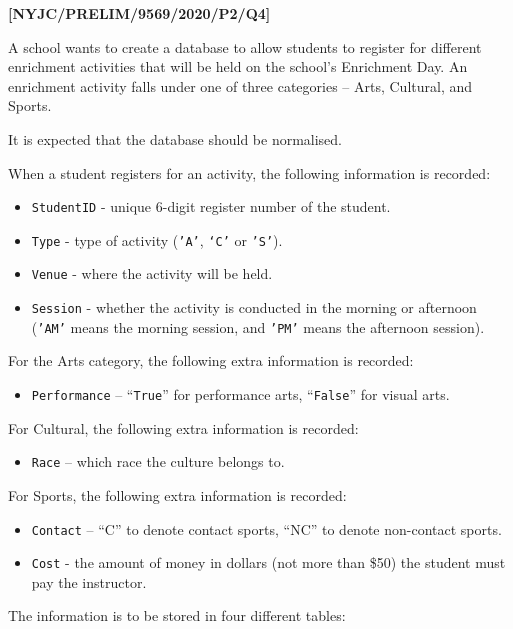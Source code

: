 \item \textbf{{[}NYJC/PRELIM/9569/2020/P2/Q4{]} }

A school wants to create a database to allow students to register
for different enrichment activities that will be held on the school\textquoteright s
Enrichment Day. An enrichment activity falls under one of three categories
-- Arts, Cultural, and Sports. 

It is expected that the database should be normalised. 

When a student registers for an activity, the following information
is recorded: 
\begin{itemize}
\item \texttt{StudentID} - unique 6-digit register number of the student. 
\item \texttt{Type} - type of activity (\texttt{'A\textquoteright }, \texttt{\textquoteleft C\textquoteright{}}
or \texttt{'S'}). 
\item \texttt{Venue} - where the activity will be held. 
\item \texttt{Session} - whether the activity is conducted in the morning
or afternoon (\texttt{'AM'} means the morning session, and \texttt{'PM'}
means the afternoon session). 
\end{itemize}
For the Arts category, the following extra information is recorded: 
\begin{itemize}
\item \texttt{Performance} -- \textquotedblleft \texttt{True}\textquotedblright{}
for performance arts, \textquotedblleft \texttt{False}\textquotedblright{}
for visual arts. 
\end{itemize}
For Cultural, the following extra information is recorded:
\begin{itemize}
\item \texttt{Race} -- which race the culture belongs to. 
\end{itemize}
For Sports, the following extra information is recorded: 
\begin{itemize}
\item \texttt{Contact} -- \textquotedblleft C\textquotedblright{} to denote
contact sports, \textquotedblleft NC\textquotedblright{} to denote
non-contact sports. 
\item \texttt{Cost} - the amount of money in dollars (not more than \$50)
the student must pay the instructor. 
\end{itemize}
The information is to be stored in four different tables: 

